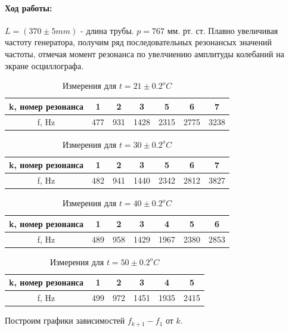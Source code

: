\documentclass[a4paper]{article}
\begin{document}
	\paragraph{Ход работы:}
	$L=(370\pm 5 mm)$ - длина трубы. $p=767$ мм. рт. ст.
	Плавно увеличивая частоту генератора, получим ряд последовательных резонансых значений частоты, отмечая момент резонанса по увелчиению амплитуды колебаний на экране осциллографа.
	\begin{table}[h!]
 		\centering
	\begin{tabular}{|c|c|c|c|c|c|c|}
\hline
		k, номер резонанса & 1 & 2 & 3  & 5 & 6 & 7 \\
		\hline
		f, Hz & 477 & 931 & 1428 & 2315 & 2775 & 3238 \\
		\hline
    	\end{tabular}
  		\caption{Измерения для $t=21\pm 0.2 ^oC$}
	\end{table}
	\begin{table}[h!]
 		\centering
	\begin{tabular}{|c|c|c|c|c|c|c|}
\hline
		k, номер резонанса & 1 & 2 & 3  & 5 & 6 & 7 \\
		\hline
		f, Hz & 482 & 941 & 1440 & 2342 & 2812 & 3827 \\
		\hline
    	\end{tabular}
  		\caption{Измерения для $t=30\pm 0.2 ^oC$}
	\end{table}
	\begin{table}[h!]
 		\centering
	\begin{tabular}{|c|c|c|c|c|c|c|}
\hline
		k, номер резонанса & 1 & 2 & 3  & 4 & 5 & 6 \\
		\hline
		f, Hz & 489 & 958 & 1429 & 1967 & 2380&  2853 \\
		\hline
    	\end{tabular}
  		\caption{Измерения для $t=40\pm 0.2 ^oC$}
	\end{table}
	\begin{table}[h!]
 		\centering
	\begin{tabular}{|c|c|c|c|c|c|}
\hline
		k, номер резонанса & 1 & 2 & 3  & 4 & 5 \\
		\hline
		f, Hz & 499 & 972 & 1451 & 1935 & 2415 \\
		\hline
    	\end{tabular}
  		\caption{Измерения для $t=50\pm 0.2 ^oC$}
	\end{table}
	Построим графики зависимостей $f_{k+1}-f_1$ от $k$.
\end{document}
